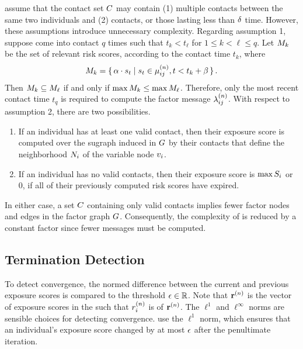 \citet{Ayday2021} assume that the contact set $C$ may contain (1) multiple contacts between the same two individuals and (2)  contacts, or those lasting less than $\delta$ time. However, these assumptions introduce unnecessary complexity. Regarding assumption 1, suppose  come into contact $q$ times such that $t_k < t_\ell$ for $1 \leq k < \ell \leq q$. Let $M_k$ be the set of relevant risk scores, according to the contact time $t_k$, where
%
\begin{equation*}
  M_k = \set{ \alpha\cdot s_t | s_t \in \mu_{ij}^{(n)}, t < t_k + \beta}.
\end{equation*}
%
Then $M_k \subseteq M_\ell$ if and only if $\max M_k \leq \max M_\ell$. Therefore, only the most recent contact time $t_q$ is required to compute the factor message $\lambda_{ij}^{(n)}$. With respect to assumption 2, there are two possibilities.
%
\begin{enumerate}
  \item If an individual has at least one valid contact, then their exposure score is computed over the sugraph induced in $G$ by their contacts that define the neighborhood $N_i$ of the variable node $\vVariable_i$.
  \item If an individual has no valid contacts, then their exposure score is $\max S_i$ or $0$, if all of their previously computed risk scores have expired.
\end{enumerate}
%
In either case, a set $C$ containing only valid contacts implies fewer factor nodes and edges in the factor graph $G$. Consequently, the complexity of \cRiskPropagation{} is reduced by a constant factor since fewer messages must be computed.

\subsection{Termination Detection}

To detect convergence, the normed difference between the current and previous exposure scores is compared to the threshold $\epsilon \in \mathbb{R}$. Note that $\vIndexedMaxExpScores{n}$ is the vector of exposure scores in the  such that $\vIndexedMaxExpScores[i]{n}$ is  of $\vIndexedMaxExpScores{n}$. The $\ell^1$ and $\ell^\infty$ norms are sensible choices for detecting convergence. \citet{Ayday2021} use the $\ell^1$ norm, which ensures that an individual's exposure score changed by at most $\epsilon$ after the penultimate iteration.

